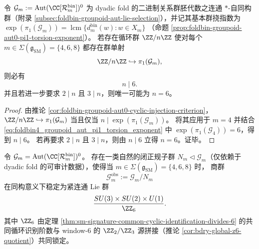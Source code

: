 \begin{theorem}\label{thm:sm-signature-common-cyclic-identification-divides-6}
令 \(\mathcal G_m:=\mathrm{Aut}(\CC[\mathcal{R}_m^{\mathrm{bin}}])^0\) 为 dyadic fold 的二进制关系群胚代数之连通 \(\ast\)-自同构群（附录 \ref{subsec:foldbin-groupoid-aut-lie-selection}），并记其基本群挠指数为
\(
\exp(\pi_1(\mathcal G_m))
=\operatorname{lcm}\{d_m^{\mathrm{bin}}(w):w\in X_m\}
\)
（命题 \ref{prop:foldbin-groupoid-aut0-pi1-torsion-exponent}）。
若存在循环群 \(\ZZ/n\ZZ\) 使对每个 \(m\in\Sigma(\mathfrak g_{\mathrm{SM}})=\{4,6,8\}\) 都存在群单射
\[
\ZZ/n\ZZ\hookrightarrow \pi_1(\mathcal G_m),
\]
则必有
\[
n\mid 6.
\]
并且若进一步要求 \(2\mid n\) 且 \(3\mid n\)，则唯一可能为 \(n=6\)。
\end{theorem}
\begin{proof}
由推论 \ref{cor:foldbin-groupoid-aut0-cyclic-injection-criterion}，\(\ZZ/n\ZZ\hookrightarrow \pi_1(\mathcal G_m)\) 当且仅当 \(n\mid \exp(\pi_1(\mathcal G_m))\)。
将其应用于 \(m=4\) 并结合 \eqref{eq:foldbin4_groupoid_aut_pi1_torsion_exponent} 中 \(\exp(\pi_1(\mathcal G_4))=6\)，得到 \(n\mid 6\)。
若再要求 \(2\mid n\) 且 \(3\mid n\)，则由 \(n\mid 6\) 立得 \(n=6\)。证毕。
\end{proof}

\begin{conjecture}\label{conj:sm-global-form-extraction-from-torsion-spectrum}
令 \(\mathcal G_m=\mathrm{Aut}(\CC[\mathcal{R}_m^{\mathrm{bin}}])^0\)。
存在一类自然的闭正规子群 \(N_m\triangleleft \mathcal G_m\)（仅依赖于 dyadic fold 的可审计数据），使得当 \(m\in\Sigma(\mathfrak g_{\mathrm{SM}})=\{4,6,8\}\) 时，
商群
\[
\mathcal G_m^{\mathrm{obs}}:=\mathcal G_m/N_m
\]
在同构意义下稳定为紧连通 Lie 群
\[
\frac{SU(3)\times SU(2)\times U(1)}{\ZZ_6}.
\]
其中 \(\ZZ_6\) 由定理 \ref{thm:sm-signature-common-cyclic-identification-divides-6} 的共同循环识别阶数与 window-\(6\) 的 \(\ZZ_2/\ZZ_3\) 源拼接（推论 \ref{cor:bdry-global-z6-quotient}）共同锁定。
\end{conjecture}

